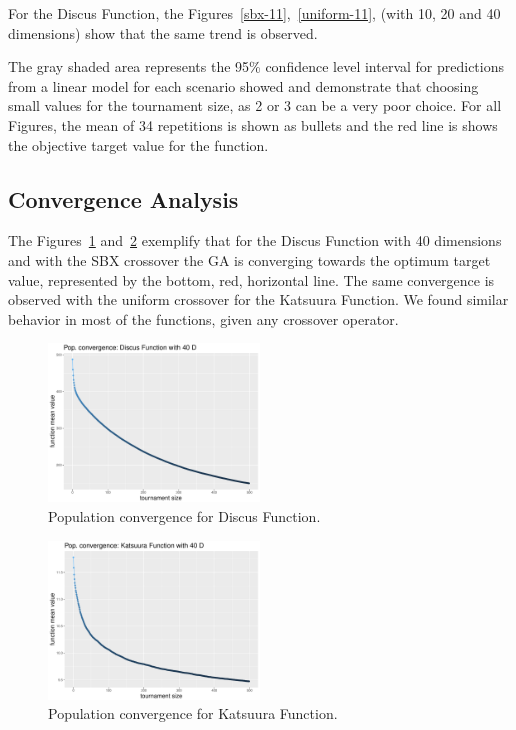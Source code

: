 For the Discus Function, the Figures~\ref{sbx-11},~\ref{uniform-11}, (with 10, 20 and 40 dimensions) show that the same trend is observed. 

The gray shaded area represents the 95\% confidence level interval for predictions from a linear model for each scenario showed and demonstrate that choosing small values for the tournament size, as 2 or 3 can be a very poor choice. For all Figures, the mean of 34 repetitions is shown as bullets and the red line is shows the objective target value for the function.


\subsection{Convergence Analysis}
The Figures~\ref{convegence-11} and~\ref{convergence-23} exemplify that for the Discus Function with 40 dimensions and with the SBX crossover the GA is converging towards the optimum target value, represented by the bottom, red, horizontal line. The same convergence is observed with the uniform crossover for the Katsuura Function. We found similar behavior in most of the functions, given any crossover operator.

\begin{figure}[t]
	\includegraphics[width=0.5\textwidth]{img/Uniform_convergence_40D_DiscusF.pdf}
	\caption{Population convergence for Discus Function.}
	\label{convegence-11}
\end{figure}


\begin{figure}[t]
	\includegraphics[width=0.5\textwidth]{img/Sbx_convergence_40D_katsuuraF.pdf}
	\caption{Population convergence for Katsuura Function.}
	\label{convergence-23}
\end{figure}


